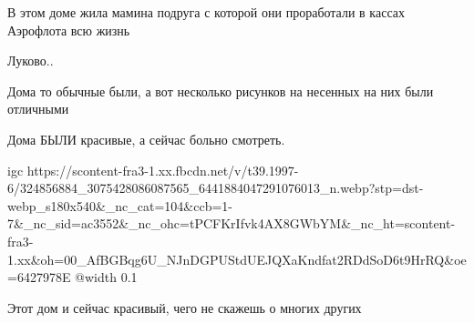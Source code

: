  
 
 
 
 

\qqSecCmt


В этом доме жила мамина подруга с которой они проработали в кассах Аэрофлота всю жизнь


Луково.. 🙁


Дома то обычные были, а вот несколько рисунков на несенных на них были отличными


Дома БЫЛИ красивые, а сейчас больно смотреть.


\ifcmt
  igc https://scontent-fra3-1.xx.fbcdn.net/v/t39.1997-6/324856884_3075428086087565_6441884047291076013_n.webp?stp=dst-webp_s180x540&_nc_cat=104&ccb=1-7&_nc_sid=ac3552&_nc_ohc=tPCFKrIfvk4AX8GWbYM&_nc_ht=scontent-fra3-1.xx&oh=00_AfBGBqg6U_NJnDGPUStdUEJQXaKndfat2RDdSoD6t9HrRQ&oe=6427978E
	@width 0.1
\fi


Этот дом и сейчас красивый, чего не скажешь о многих других
